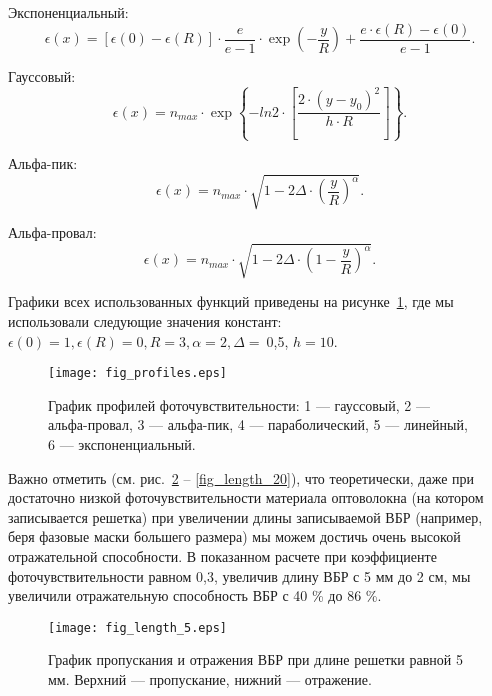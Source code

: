 Экспоненциальный:
\begin{equation} \label{eq2.4}
    \epsilon(x)=[\epsilon(0)-\epsilon(R)]\cdot\frac{e}{e-1}\cdot\exp\left(-\frac{y}{R}\right)+\frac{e\cdot\epsilon(R)-\epsilon(0)}{e-1}.
\end{equation}

Гауссовый:
\begin{equation} \label{eq2.5}
    \epsilon(x)=n_{max}\cdot\exp\left\lbrace-ln2\cdot\left[\frac{2\cdot(y-y_0)^2}{h\cdot R}\right]\right\rbrace.
\end{equation}

Альфа-пик:
\begin{equation} \label{eq2.6}
    \epsilon(x)=n_{max}\cdot\sqrt{1-2\Delta\cdot\left(\frac{y}{R}\right)^\alpha}.
\end{equation}

Альфа-провал:
\begin{equation} \label{eq2.7}
    \epsilon(x)=n_{max}\cdot\sqrt{1-2\Delta\cdot\left(1-\frac{y}{R}\right)^\alpha}.
\end{equation}

Графики всех использованных функций приведены на рисунке~\ref{fig_profiles}, где мы использовали следующие значения констант: $\epsilon(0)=1, \epsilon(R)=0, R=3, \alpha=2, \Delta=\:$0,5, $h=10$.

\begin{figure}
\centering
\texttt{[image: fig\_profiles.eps]}
\caption{График профилей фоточувствительности: 1 --- гауссовый, 2 --- альфа-провал, 3 --- альфа-пик, 4 --- параболический, 5 --- линейный, 6 --- экспоненциальный.}\label{fig_profiles}
\end{figure}

Важно отметить (см. рис.~\ref{fig_length_5} -- \ref{fig_length_20}), что теоретически, даже при достаточно низкой фоточувствительности материала оптоволокна (на котором записывается решетка) при увеличении длины записываемой ВБР (например, беря фазовые маски большего размера) мы можем достичь очень высокой отражательной способности. В показанном расчете при коэффициенте фоточувствительности равном 0,3, увеличив длину ВБР с 5 мм до 2 см, мы увеличили отражательную способность ВБР с 40 \% до 86 \%.

\begin{figure}
  \centering
  \texttt{[image: fig\_length\_5.eps]}\\
  \caption{График пропускания и отражения ВБР при длине решетки равной 5 мм. Верхний --- пропускание, нижний --- отражение.}\label{fig_length_5}
\end{figure}

